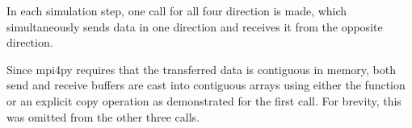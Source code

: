 In each simulation step, one  call for all four direction is made, which simultaneously sends data in one direction and receives it from the opposite direction.

Since mpi4py requires that the transferred data is contiguous in memory, both send and receive buffers are cast into contiguous arrays using either the  function or an explicit copy operation as demonstrated for the first  call. For brevity, this was omitted from the other three  calls.
